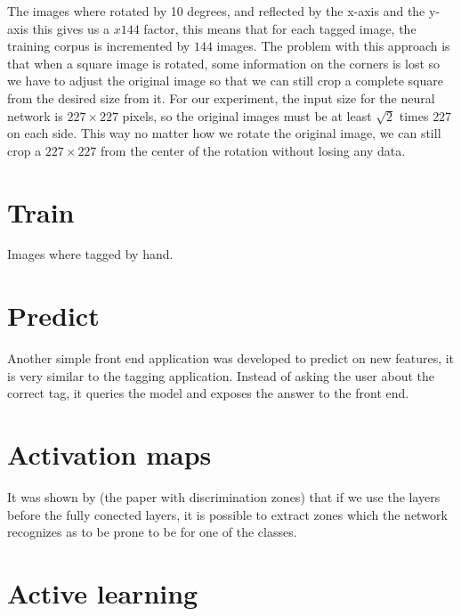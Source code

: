 The images where rotated by 10 degrees, and reflected by the x-axis and the y-axis this gives us a $x144$ factor, this means that for each tagged image, the training corpus is incremented by $144$ images. The problem with this approach is that when a square image is rotated, some information on the corners is lost so we have to adjust the original image so that we can still crop a complete square from the desired size from it. For our experiment, the input size for the neural network is $227\times 227$ pixels, so the original images must be at least $\sqrt{2}$ times $227$ on each side. This way no matter how we rotate the original image, we can still crop a $227\times 227$ from the center of the rotation without losing any data.

\section{Train}

Images where tagged by hand.

\section{Predict}

Another simple front end application was developed to predict on new features, it is very similar to the tagging application. Instead of asking the user about the correct tag, it queries the model and exposes the answer to the front end.

\section{Activation maps}

It was shown by (the paper with discrimination zones) that if we use the layers before the fully conected layers, it is possible to extract zones which the network recognizes as to be prone to be for one of the classes.

\section{Active learning}



